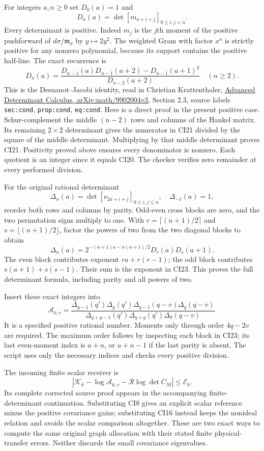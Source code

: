 \documentclass[11pt]{article}
\begin{document}
For integers \(a,n\ge0\) set \(D_0(a)=1\) and \[
D_n(a)=\det[m_{a+i+j}]_{0\le i,j<n}.
\tag{CI20}
\] Every determinant is positive. Indeed \(m_j\) is the \(j\)th moment of the positive pushforward of \(d\sigma/\mathfrak m_\sigma\) by \(y\mapsto2y^2\). The weighted Gram with factor \(x^a\) is strictly positive for any nonzero polynomial, because its support contains the positive half-line. The exact recurrence is \[
\boxed{D_n(a)=\frac{D_{n-1}(a)D_{n-1}(a+2)-D_{n-1}(a+1)^2}{D_{n-2}(a+2)}\quad(n\ge2).}
\tag{CI21}
\] This is the Desnanot--Jacobi identity, read in Christian Krattenthaler, \href{https://arxiv.org/abs/math/9902004v3}{Advanced Determinant Calculus, arXiv:math/9902004v3}, Section 2.3, source labels \texttt{sec:cond}, \texttt{prop:cond}, \texttt{eq:cond}. Here is a direct proof in the present positive case. Schur-complement the middle \((n-2)\) rows and columns of the Hankel matrix. Its remaining \(2\times2\) determinant gives the numerator in CI21 divided by the square of the middle determinant. Multiplying by that middle determinant proves CI21. Positivity proved above ensures every denominator is nonzero. Each quotient is an integer since it equals CI20. The checker verifies zero remainder at every performed division.

For the original rational determinant \[
\Delta_n(a)=\det[\nu_{2a+i+j}]_{0\le i,j\le n},\quad \Delta_{-1}(a)=1,
\tag{CI22}
\] reorder both rows and columns by parity. Odd-even cross blocks are zero, and the two permutation signs multiply to one. With \(r=\lceil(n+1)/2\rceil\) and \(s=\lfloor(n+1)/2\rfloor\), factor the powers of two from the two diagonal blocks to obtain \[
\boxed{\Delta_n(a)=2^{-(n+1)a-n(n+1)/2}D_r(a)D_s(a+1).}
\tag{CI23}
\] The even block contributes exponent \(ra+r(r-1)\); the odd block contributes \(s(a+1)+s(s-1)\). Their sum is the exponent in CI23. This proves the full determinant formula, including parity and all powers of two.

Insert these exact integers into \[
\mathcal A_{k,v}=\frac{\Delta_{g-1}(q')\Delta_g(q')\Delta_{q-1}(q-v)\Delta_q(q-v)}{\Delta_{q+g-1}(q')\Delta_{q+g}(q')\Delta_0(q-v)}.
\tag{CI24}
\] It is a specified positive rational number. Moments only through order \(4q-2v\) are required. The maximum order follows by inspecting each block in CI23; its last even-moment index is \(a+n\), or \(a+n-1\) if the last parity is absent. The script uses only the necessary indices and checks every positive division.

The incoming finite scalar receiver is \[
\left|\mathcal K_k-\log\mathcal A_{k,v}-\mathcal R\log\det C_M\right|\le\mathcal E_k.
\tag{CI25}
\] Its complete corrected source proof appears in the accompanying finite-determinant continuation. Substituting CI8 gives an explicit scalar reference minus the positive covariance gains; substituting CI16 instead keeps the nonideal relation and avoids the scalar comparison altogether. These are two exact ways to compute the same original graph allocation with their stated finite physical-transfer errors. Neither discards the small covariance eigenvalues.
\end{document}
